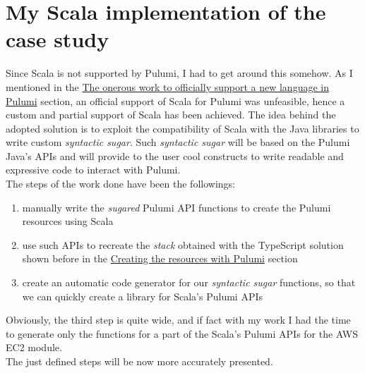\section{My Scala implementation of the case study}
Since Scala is not supported by Pulumi, I had to get around this somehow.
As I mentioned in the \hyperref[sssec:off-support-pulumi]{The onerous work to officially support a new language in Pulumi} section, an official support of Scala for Pulumi was unfeasible, hence a custom and partial support of Scala has been achieved.
The idea behind the adopted solution is to exploit the compatibility of Scala with the Java libraries to write custom \textit{syntactic sugar}.
Such \textit{syntactic sugar} will be based on the Pulumi Java's APIs and will provide to the user cool constructs to write readable and expressive code to interact with Pulumi.\\
The steps of the work done have been the followings:
\begin{enumerate}
  \item manually write the \textit{sugared} Pulumi API functions to create the Pulumi resources using Scala
  \item use such APIs to recreate the \textit{stack} obtained with the TypeScript solution shown before in the \hyperref[sec:ts-res-creation]{Creating the resources with Pulumi} section
  \item create an automatic code generator for our \textit{syntactic sugar} functions, so that we can quickly create a library for Scala's Pulumi APIs
\end{enumerate}
Obviously, the third step is quite wide, and if fact with my work I had the time to generate only the functions for a part of the Scala's Pulumi APIs for the AWS EC2 module.\\
The just defined steps will be now more accurately presented.


